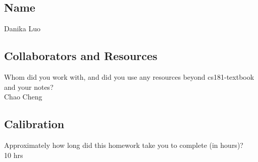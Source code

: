 \documentclass[submit]{harvardml}
\begin{document}
\newpage
\subsection*{Name}
Danika Luo

\subsection*{Collaborators and Resources}
Whom did you work with, and did you use any resources beyond cs181-textbook and your notes?\\
Chao Cheng

\subsection*{Calibration}
Approximately how long did this homework take you to complete (in hours)? \\
10 hrs
\end{document}
